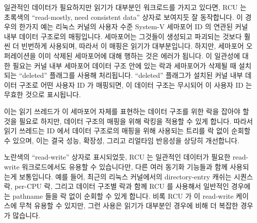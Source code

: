 \fi

일관적인 데이터가 필요하지만 읽기가 대부분인 워크로드를 가지고 있다면, RCU 는
초록색의 ``read-mostly, need consistent data'' 상자로 보여지듯 잘 동작합니다.
이 경우의 한가지 예는 리눅스 커널의 사용자 수준 System-V 세마포어 ID 의 연관된
커널 내부 데이터 구조로의 매핑입니다.
세마포어는 그것들이 생성되고 파괴되는 것보다 훨씬 더 빈번하게 사용되며, 따라서
이 매핑은 읽기가 대부분입니다.
하지만, 세마포어 오퍼레이션을 이미 삭제된 세마포어에 대해 행하는 것은 에러가
됩니다.
이 일관성에 대한 필요는 커널 내부 세마포어 데이터 구조 안에 있는 락과
세마포어가 삭제될 때 설치되는 ``deleted'' 플래그를 사용해 처리됩니다.
``deleted'' 플래그가 설치된 커널 내부 데이터 구조로 어떤 사용자 ID 가 매핑되면,
이 데이터 구조는 무시되어 이 사용자 ID 는 무효한 것으로 표시됩니다.

이는 읽기 쓰레드가 이 세마포어 자체를 표현하는 데이터 구조를 위한 락을 잡아야
할것을 필요로 하지만, 데이터 구조의 매핑을 위해 락킹을 적용할 수 있게 합니다.
따라서 읽기 쓰레드는 ID 에서 데이터 구조로의 매핑을 위해 사용되는 트리를 락
없이 순회할 수 있으며, 이는 결국 성능, 확장성, 그리고 리얼타임 반응성을 상당히
개선합니다.

노란색의 ``read-write'' 상자로 표시되었듯, RCU 는 일관적인 데이터가 필요한
read-write 워크로드에서도 유용할 수 있습니다만, 다른 여러 동기화 기능들과 함께
사용되는게 보통입니다.
예를 들어, 최근의 리눅스 커널에서의 directory-entry 캐쉬는 시퀀스 락, per-CPU
락, 그리고 데이터 구조별 락과 함께 RCU 를 사용해서 일반적인 경우에는 pathname
들을 락 없이 순회할 수 있게 합니다.
비록 RCU 가 이 read-write 케이스에 무척 유용할 수 있지만, 그런 사용은 읽기가
대부분인 경우에 비해 더 복잡한 경우가 많습니다.

